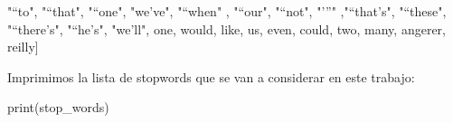 \documentclass[
  11pt,
  a4paper,
]{article}
\newenvironment{Shaded}{\begin{snugshade}}{\end{snugshade}}
\newcommand{\BuiltInTok}[1]{#1}
\newcommand{\NormalTok}[1]{#1}
\newcommand{\StringTok}[1]{\textcolor[rgb]{0.31,0.60,0.02}{#1}}
\begin{document}
\begin{Shaded}
\begin{Highlighting}[]
  \StringTok{"“to"}\NormalTok{, }\StringTok{"“that"}\NormalTok{, }\StringTok{"“one"}\NormalTok{, }\StringTok{"we’ve"}\NormalTok{, }\StringTok{"“when"}\NormalTok{ , }\StringTok{"“our"}\NormalTok{, }\StringTok{"“not"}\NormalTok{, }\StringTok{"’”"}\NormalTok{ ,}\StringTok{"“that’s"}\NormalTok{, }\StringTok{"“these"}\NormalTok{, }\StringTok{"“there’s"}\NormalTok{, }\StringTok{"“he’s"}\NormalTok{, }\StringTok{"we’ll"}\NormalTok{, }\StringTok{\textquotesingle{}one\textquotesingle{}}\NormalTok{,}
   \StringTok{\textquotesingle{}would\textquotesingle{}}\NormalTok{, }\StringTok{\textquotesingle{}like\textquotesingle{}}\NormalTok{, }\StringTok{\textquotesingle{}us\textquotesingle{}}\NormalTok{, }\StringTok{\textquotesingle{}even\textquotesingle{}}\NormalTok{, }\StringTok{\textquotesingle{}could\textquotesingle{}}\NormalTok{, }\StringTok{\textquotesingle{}two\textquotesingle{}}\NormalTok{, }\StringTok{\textquotesingle{}many\textquotesingle{}}\NormalTok{, }\StringTok{\textquotesingle{}angerer\textquotesingle{}}\NormalTok{, }\StringTok{\textquotesingle{}reilly\textquotesingle{}}\NormalTok{]}
\end{Highlighting}
\end{Shaded}

Imprimimos la lista de stopwords que se van a considerar en este
trabajo:

\begin{Shaded}
\begin{Highlighting}[]
\BuiltInTok{print}\NormalTok{(stop\_words)}
\end{Highlighting}
\end{Shaded}
\end{document}
